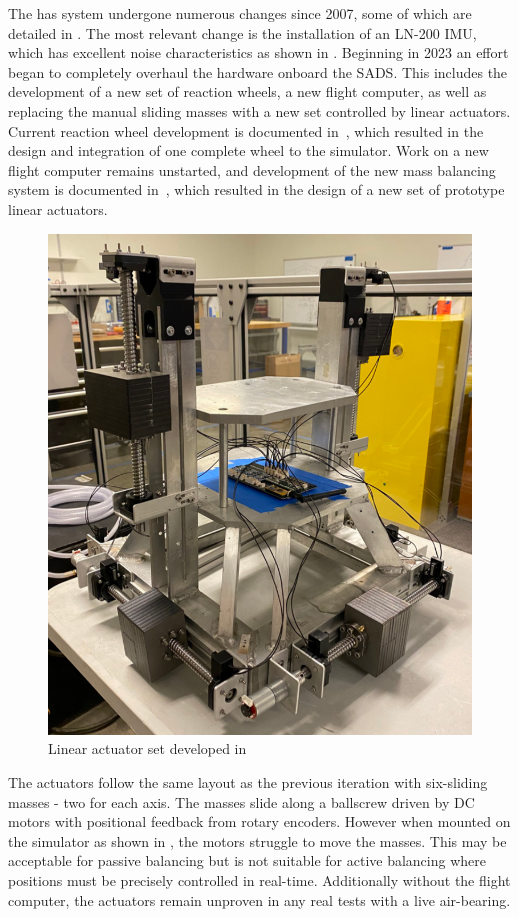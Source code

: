 The has system undergone numerous changes since 2007, some of which are detailed in . The most relevant change is the installation of an LN-200 IMU, which has excellent noise characteristics as shown in . Beginning in 2023 an effort began to completely overhaul the hardware onboard the SADS. This includes the development of a new set of reaction wheels, a new flight computer, as well as replacing the manual sliding masses with a new set controlled by linear actuators. Current reaction wheel development is documented in~\cite{nalley2025development}, which resulted in the design and integration of one complete wheel to the simulator. Work on a new flight computer remains unstarted, and development of the new mass balancing system is documented in~\cite{gilman_automatic_2024}, which resulted in the design of a new set of prototype linear actuators. 
\begin{figure}[h]\label{fig:gillman_final_work}
    \centering
    \includegraphics[width=0.70\linewidth]{figures/gillman_final_work.png}
    \caption{Linear actuator set developed in~\cite{gilman_automatic_2024}}
\end{figure}
The actuators follow the same layout as the previous iteration with six-sliding masses - two for each axis. The masses slide along a ballscrew driven by DC motors with positional feedback from rotary encoders. However when mounted on the simulator as shown in , the motors struggle to move the masses. This may be acceptable for passive balancing but is not suitable for active balancing where positions must be precisely controlled in real-time. Additionally without the flight computer, the actuators remain unproven in any real tests with a live air-bearing. 

